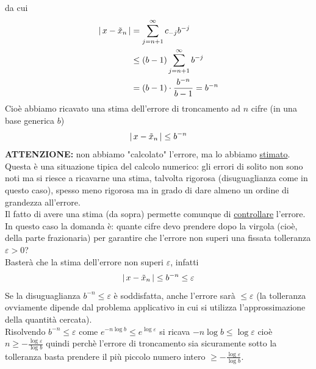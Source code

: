 \documentclass[12pt]{article}
\begin{document}
da cui
\[ \begin{split}
    \lvert \, x - \Tilde{x}_n \,\rvert & = \sum_{j=n+1}^\infty c_{-j} b^{-j} \\
    & \le (b-1)\sum_{j=n+1}^{\infty} b^{-j} \\
    & = (b-1) \cdot \frac{b^{-n}}{b - 1} = b^{-n}
\end{split}\]
Cioè abbiamo ricavato una stima dell'errore di troncamento ad $n$ cifre (in una base generica $b$) \[ \lvert \, x - \Tilde{x}_n \,\rvert \le b^{-n} \]
\textbf{ATTENZIONE:} non abbiamo "calcolato" l'errore, ma lo abbiamo \underline{stimato}. \\
Questa è una situazione tipica del calcolo numerico: gli errori di solito non sono noti ma si riesce a ricavarne una stima, talvolta rigorosa (disuguaglianza come in questo caso), spesso meno rigorosa ma in grado di dare almeno un ordine di grandezza all'errore. \\
Il fatto di avere una stima (da sopra) permette comunque di \underline{controllare} l'errore. \\
In questo caso la domanda è: quante cifre devo prendere dopo la virgola (cioè, della parte frazionaria) per garantire che l'errore non superi una fissata tolleranza $\varepsilon > 0$? \\
Basterà che la stima dell'errore non superi $\varepsilon$, infatti
\[ \lvert \, x - \Tilde{x}_n \,\rvert \le b^{-n} \le \varepsilon\]
Se la disuguaglianza $b^{-n} \le \varepsilon$ è soddisfatta, anche l'errore sarà $\le \varepsilon$ (la tolleranza ovviamente dipende dal problema applicativo in cui si utilizza l'approssimazione della quantità cercata).\\
Risolvendo $b^{-n} \le \varepsilon$ come $e^{-n \log b} \le e^{\log \varepsilon}$ si ricava $-n \log b \le \log \varepsilon$ cioè $n \ge - \frac{\log \varepsilon}{\log b}$ quindi perchè l'errore di troncamento sia sicuramente sotto la tolleranza basta prendere il più piccolo numero intero $\ge - \frac{\log \varepsilon}{\log b}$.
\end{document}
